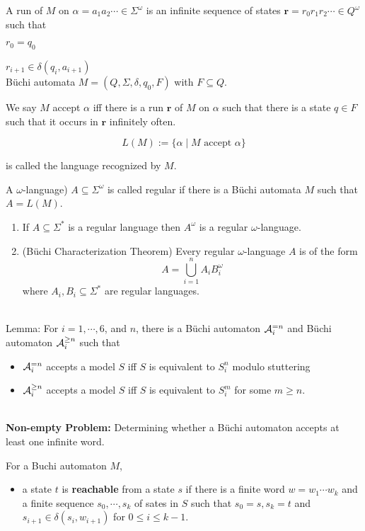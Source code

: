 \documentclass[12pt]{article}
\begin{document}
\begin{CJK*}{GBK}{song}
A run of $M$ on $\alpha=a_1a_2\cdots\in\Sigma^{\omega}$ is an infinite sequence of states $\mathbf{r}=r_0r_1r_2\cdots\in Q^{\omega}$ such that

$r_0=q_0$

$r_{i+1}\in \delta(q_i,a_{i+1})$
\ \\


B\"{u}chi automata $M=(Q,\Sigma,\delta, q_0, F)$ with $F\subseteq Q$.

We say $M$ accept $\alpha$  iff there is a run $\mathbf{r}$ of $M$ on $\alpha$ such that there is a state $q\in F$ such that it occurs in $\mathbf{r}$ infinitely often.

$$L(M):=\{\alpha\mid M \mbox{ accept } \alpha\}$$

is called the language recognized by $M$.

A $\omega$-language) $A\subseteq \Sigma^{\omega}$ is called regular if there is a B\"{u}chi automata $M$ such that $A=L(M)$.



\begin{enumerate}
\item If $A\subseteq\Sigma^*$ is a regular language then $A^{\omega}$ is a regular $\omega$-language.

\item (B\"{u}chi Characterization Theorem) Every regular $\omega$-language $A$ is of the form $$A=\bigcup_{i=1}^nA_iB_i^{\omega}$$
where $A_i, B_i\subseteq \Sigma^*$ are regular languages.
\end{enumerate}
\ \\

Lemma: For $i=1,\cdots,6$, and $n$, there is a B\"{u}chi automaton ${\cal A}_i^{=n}$ and B\"{u}chi automaton ${\cal A}^{\geq n}_i$ such that
\begin{itemize}
\item ${\cal A}_i^{=n}$ accepts a model $S$ iff $S$ is equivalent to $S^n_i$ modulo stuttering
\item ${\cal A}^{\geq n}_i$ accepts a model $S$ iff $S$ is equivalent to $S^m_i$ for some $m\geq n$.
\end{itemize}
\ \\

{\bf Non-empty Problem:} Determining whether a B\"{u}chi automaton accepts at least one infinite word.

For a Buchi automaton $M$,
\begin{itemize}
\item a state $t$ is {\bf reachable} from a state $s$ if there is a finite word $w=w_1\cdots w_k$ and a finite sequence $s_0,\cdots, s_k$ of sates in $S$ such that $s_0=s, s_k=t$ and $s_{i+1}\in \delta(s_i,w_{i+1})$ for $0\leq i\leq k-1$.


\end{itemize}
\end{CJK*}
\end{document}
